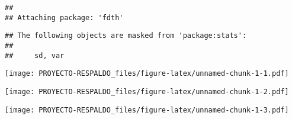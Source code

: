 \documentclass[
]{article}
\newenvironment{Shaded}{\begin{snugshade}}{\end{snugshade}}
\newcommand{\CommentTok}[1]{\textcolor[rgb]{0.56,0.35,0.01}{\textit{#1}}}
\newcommand{\DataTypeTok}[1]{\textcolor[rgb]{0.13,0.29,0.53}{#1}}
\newcommand{\DecValTok}[1]{\textcolor[rgb]{0.00,0.00,0.81}{#1}}
\newcommand{\KeywordTok}[1]{\textcolor[rgb]{0.13,0.29,0.53}{\textbf{#1}}}
\newcommand{\NormalTok}[1]{#1}
\newcommand{\OperatorTok}[1]{\textcolor[rgb]{0.81,0.36,0.00}{\textbf{#1}}}
\newcommand{\StringTok}[1]{\textcolor[rgb]{0.31,0.60,0.02}{#1}}
\begin{document}
\begin{verbatim}
## 
## Attaching package: 'fdth'
\end{verbatim}

\begin{verbatim}
## The following objects are masked from 'package:stats':
## 
##     sd, var
\end{verbatim}

\begin{Shaded}
\end{Shaded}

\texttt{[image: PROYECTO-RESPALDO\_files/figure-latex/unnamed-chunk-1-1.pdf]}

\begin{Shaded}
\end{Shaded}

\texttt{[image: PROYECTO-RESPALDO\_files/figure-latex/unnamed-chunk-1-2.pdf]}

\begin{Shaded}
\end{Shaded}

\texttt{[image: PROYECTO-RESPALDO\_files/figure-latex/unnamed-chunk-1-3.pdf]}
\end{document}

